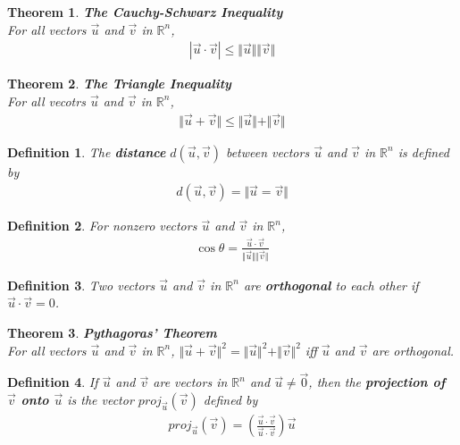 \documentclass{article}
\theoremstyle{sltheorem}
\newtheorem{definition}{Definition}[section]
\newtheorem{theorem}{Theorem}[section]
\begin{document}
\begin{theorem}
    \textbf{The Cauchy-Schwarz Inequality}\\
    For all vectors $\vec u$ and $\vec v$ in $\mathbb{R}^n$,
    \begin{gather*}
        |\vec u \cdot \vec v| \leq \Vert \vec u \Vert \Vert \vec v \Vert
    \end{gather*}
\end{theorem}
\begin{theorem}
    \textbf{The Triangle Inequality}\\
    For all vecotrs $\vec u$ and $\vec v$ in $\mathbb{R}^n$,
    \begin{gather*}
        \Vert \vec u + \vec v \Vert \leq \Vert \vec u \Vert + \Vert \vec v \Vert
    \end{gather*}
\end{theorem}
\begin{definition}
    The \textbf{distance} $d(\vec u, \vec v)$ between vectors $\vec u$ and $\vec v$ in $\mathbb{R}^n$ is defined by
    \begin{gather*}
        d(\vec u, \vec v) = \Vert \vec u = \vec v \Vert
    \end{gather*}
\end{definition}
\begin{definition}
    For nonzero vectors $\vec u$ and $\vec v$ in $\mathbb{R}^n$,
    \begin{gather*}
        \cos\theta = \frac{\vec u \cdot \vec v}{\Vert \vec u \Vert \Vert \vec v\Vert}
    \end{gather*}
\end{definition}
\begin{definition}
    Two vectors $\vec u$ and $\vec v$ in $\mathbb{R}^n$ are \textbf{orthogonal} to each other if $\vec u \cdot \vec v = 0$.
\end{definition}
\begin{theorem}
    \textbf{Pythagoras' Theorem}\\
    For all vectors $\vec u$ and $\vec v$ in $\mathbb{R}^n$, $\Vert \vec u + \vec v\Vert^2 = \Vert \vec u \Vert^2 + \Vert \vec v \Vert ^2$ iff $\vec u$ and $\vec v$ are orthogonal.
\end{theorem}
\begin{definition}
    If $\vec u$ and $\vec v$ are vectors in $\mathbb{R}^n$ and $\vec u \not= \vec 0$, then the \textbf{projection of $\vec v$ onto $\vec u$} is the vector $proj_{\vec u}(\vec v)$ defined by
    \begin{gather*}
        proj_{\vec u}(\vec v) = \left(\frac{\vec u \cdot \vec v}{\vec u \cdot \vec v}\right)\vec u
    \end{gather*}
\end{definition}
\end{document}
